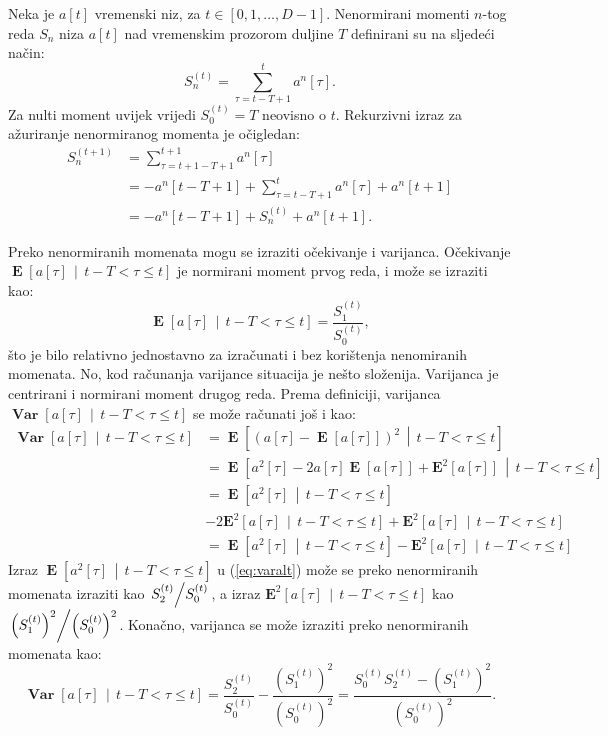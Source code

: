 \documentclass[lmodern, utf8, diplomski, numeric]{fer}
\newcommand{\E}[1]{\operatorname{\mathbf{E}}\q[#1\w]}
\newcommand{\Esq}[1]{\operatorname{\mathbf{E}^2}\q[#1\w]}
\newcommand{\Efromto}[2]{\operatorname{\mathbf{E}}\q[#1\, \middle\vert\, #2\w]}
\newcommand{\Esqfromto}[2]{\operatorname{\mathbf{E}^2}\q[#1\, \middle\vert\, #2\w]}
\newcommand{\Varfromto}[2]{\operatorname{\mathbf{Var}}\q[#1\, \middle\vert\, #2\w]}
\newcommand{\q}{\left}
\newcommand{\w}{\right}
\begin{document}
  Neka je $a\q[t\w]$ vremenski niz, za $t \in \q[0, 1, \ldots, D - 1\w]$.
  Nenormirani momenti $n$-tog reda $S_n$ niza $a\q[t\w]$ nad vremenskim prozorom duljine $T$ definirani su na sljedeći način:
  \begin{equation}
  \label{eq:nonnorm}
  S_n^{(t)} = \sum_{\tau=t-T+1}^{t} a^n\q[\tau\w].
  \end{equation}
  Za nulti moment uvijek vrijedi $S_0^{(t)} = T$ neovisno o $t$.
  Rekurzivni izraz za ažuriranje nenormiranog momenta je očigledan:
  \begin{align}
  S_n^{(t+1)} &= \sum_{\tau=t+1-T+1}^{t+1} a^n\q[\tau\w] \nonumber \\
    &= -a^n\q[t-T+1\w] + \sum_{\tau=t-T+1}^{t} a^n\q[\tau\w] + a^n\q[t+1\w] \nonumber \\
    \label{eq:rec}
    &= -a^n\q[t-T+1\w] + S_n^{(t)} + a^n\q[t+1\w].
  \end{align}
  
  Preko nenormiranih momenata mogu se izraziti očekivanje i varijanca.
  Očekivanje $\Efromto{a\q[\tau\w]}{t - T < \tau \le t}$ je normirani moment prvog reda, i može se izraziti kao:
  \begin{equation}
  \label{eq:recmean}
  \Efromto{a\q[\tau\w]}{t - T < \tau \le t} = \frac{S_1^{(t)}}{S_0^{(t)}},
  \end{equation}
  što je bilo relativno jednostavno za izračunati i bez korištenja nenomiranih momenata.
  No, kod računanja varijance situacija je nešto složenija.
  Varijanca je centrirani i normirani moment drugog reda.
  Prema definiciji, varijanca $\Varfromto{a\q[\tau\w]}{t - T < \tau \le t}$ se može računati još i kao:
  \begin{align}
    \Varfromto{a\q[\tau\w]}{t - T < \tau \le t} &= \Efromto{\q(a\q[\tau\w] - \E{a\q[\tau\w]} \w)^2}{t - T < \tau \le t} \nonumber \\
    &= \Efromto{a^2\q[\tau\w] - 2 a\q[\tau\w] \E{a\q[\tau\w]} + \Esq{a\q[\tau\w]}}{t - T < \tau \le t} \nonumber \\
    &= \Efromto{a^2\q[\tau\w]}{t - T < \tau \le t} \nonumber \\
    & - 2\Esqfromto{a\q[\tau\w]}{t - T < \tau \le t} + \Esqfromto{a\q[\tau\w]}{t - T < \tau \le t} \nonumber \\
    \label{eq:varalt}
    &= \Efromto{a^2\q[\tau\w]}{t - T < \tau \le t} - \Esqfromto{a\q[\tau\w]}{t - T < \tau \le t}
  \end{align}
  Izraz $\Efromto{a^2\q[\tau\w]}{t - T < \tau \le t}$ u (\ref{eq:varalt}) može se preko nenormiranih momenata izraziti kao $\q. S_2^{(t)} \middle/ S_0^{(t)} \w.$,
  a izraz $\Esqfromto{a\q[\tau\w]}{t - T < \tau \le t}$ kao $\q. \q(S_1^{(t)}\w)^2 \middle/ \q(S_0^{(t)}\w)^2 \w.$.
  Konačno, varijanca se može izraziti preko nenormiranih momenata kao:
  \begin{equation}
    \label{eq:recvar}
    \Varfromto{a\q[\tau\w]}{t - T < \tau \le t} = \frac{S_2^{(t)}}{S_0^{(t)}} - \frac{\q(S_1^{(t)}\w)^2}{\q(S_0^{(t)}\w)^2}
    = \frac{S_0^{(t)} S_2^{(t)} - \q(S_1^{(t)}\w)^2}{\q(S_0^{(t)}\w)^2}.
  \end{equation}
  
\end{document}

